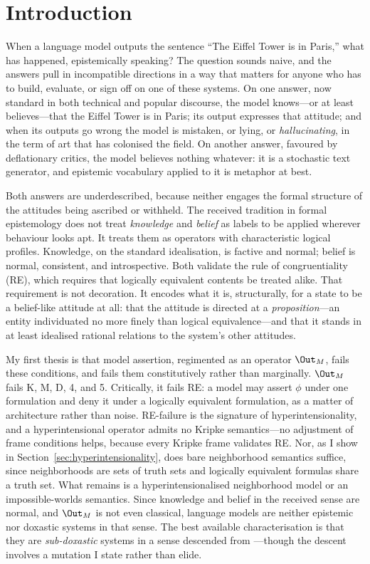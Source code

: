 \section{Introduction}
\label{sec:intro}

When a language model outputs the sentence ``The Eiffel Tower is in Paris,''
what has happened, epistemically speaking? The question sounds naive, and the
answers pull in incompatible directions in a way that matters for anyone who
has to build, evaluate, or sign off on one of these systems. On one answer, now
standard in both technical and popular discourse, the model knows---or at least
believes---that the Eiffel Tower is in Paris; its output expresses that
attitude; and when its outputs go wrong the model is mistaken, or lying, or
\emph{hallucinating}, in the term of art that has colonised the field. On
another answer, favoured by deflationary critics, the model believes nothing
whatever: it is a stochastic text generator, and epistemic vocabulary applied to
it is metaphor at best.

Both answers are underdescribed, because neither engages the formal structure of
the attitudes being ascribed or withheld. The received tradition in formal
epistemology does not treat \emph{knowledge} and \emph{belief} as labels to be
applied wherever behaviour looks apt. It treats them as operators with
characteristic logical profiles. Knowledge, on the standard idealisation, is
factive and normal; belief is normal, consistent, and introspective. Both
validate the rule of congruentiality (RE), which requires that logically
equivalent contents be treated alike. That requirement is not decoration. It
encodes what it is, structurally, for a state to be a belief-like attitude at
all: that the attitude is directed at a \emph{proposition}---an entity
individuated no more finely than logical equivalence---and that it stands in at
least idealised rational relations to the system's other attitudes.

My first thesis is that model assertion, regimented as an operator $\Out_M$,
fails these conditions, and fails them constitutively rather than marginally.
$\Out_M$ fails K, M, D, 4, and 5. Critically, it fails RE: a model may assert
$\phi$ under one formulation and deny it under a logically equivalent
formulation, as a matter of architecture rather than noise. RE-failure is the
signature of hyperintensionality, and a hyperintensional operator admits no
Kripke semantics---no adjustment of frame conditions helps, because every Kripke
frame validates RE. Nor, as I show in Section~\ref{sec:hyperintensionality},
does bare neighborhood semantics suffice, since neighborhoods are sets of truth
sets and logically equivalent formulas share a truth set. What remains is a
hyperintensionalised neighborhood model or an impossible-worlds semantics. Since
knowledge and belief in the received sense are normal, and $\Out_M$ is not even
classical, language models are neither epistemic nor doxastic systems in that
sense. The best available characterisation is that they are \emph{sub-doxastic}
systems in a sense descended from \citet{stich1978}---though the descent
involves a mutation I state rather than elide.

